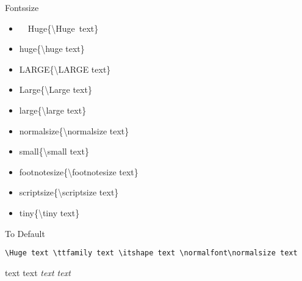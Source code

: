 \begin{frame}[fragile]{Fonts}{size}\relax
\newcommand{\putoutside}[1]{ { \csname #1\endcsname \{{\csk \textbackslash #1} text\} } }

\begin{multicols}{2}
\hspace{-20em}
\begin{itemize}
\item \hbox{\putoutside{Huge}}
\item \putoutside{huge}
\item \putoutside{LARGE}
\item \putoutside{Large}
\item \putoutside{large}
\item \putoutside{normalsize}
\item \putoutside{small}
\item \putoutside{footnotesize}
\item \putoutside{scriptsize}
\item \putoutside{tiny}
\end{itemize}
\end{multicols}

\cprotect{}

\end{frame}

\begin{frame}[fragile]{To Default}

    \lstinline[basicstyle=\tt\normalsize]|\Huge text \ttfamily text \itshape text \normalfont\normalsize text|

     \Huge text \ttfamily text \itshape text \normalfont\normalsize text
\end{frame}

